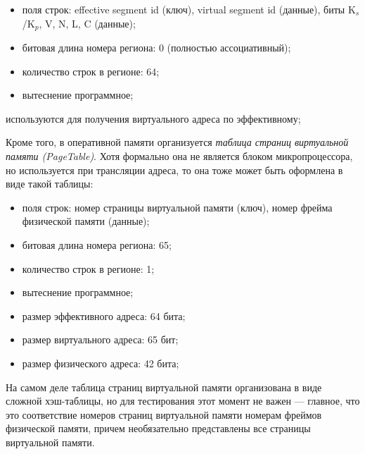 \begin{itemize}
\begin{itemize}
            \item поля строк: effective segment id (ключ), virtual segment id
(данные), биты K$_s$/K$_p$, V, N, L, C (данные);
            \item битовая длина номера региона: 0 (полностью ассоциативный);
            \item количество строк в регионе: 64;
            \item вытеснение программное;
        \end{itemize}
        используются для получения виртуального адреса по эффективному;
\end{itemize}

Кроме того, в оперативной памяти организуется \emph{таблица страниц виртуальной
памяти (PageTable)}. Хотя формально она не является блоком микропроцессора, но
используется при трансляции адреса, то она тоже может быть оформлена в виде
такой таблицы:
    \begin{itemize}
        \item поля строк: номер страницы виртуальной памяти (ключ), номер фрейма
физической памяти (данные);
        \item битовая длина номера региона: 65;
        \item количество строк в регионе: 1;
        \item вытеснение программное;
        \item размер эффективного адреса: 64 бита;
        \item размер виртуального адреса: 65 бит;
        \item размер физического адреса: 42 бита;
    \end{itemize}

На самом деле таблица страниц виртуальной памяти организована в виде сложной
хэш-таблицы, но для тестирования этот момент не важен --- главное, что это
соответствие номеров страниц виртуальной памяти номерам фреймов физической
памяти, причем необязательно представлены все страницы виртуальной памяти.

